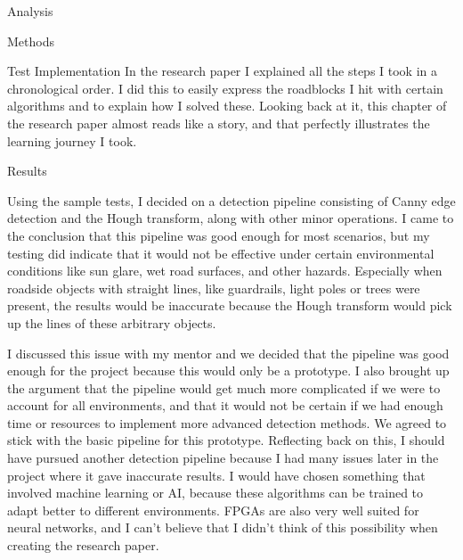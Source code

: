 \documentclass{matthijs}
\begin{document}
\begin{hoofdstuk}{Analysis}
\begin{paragraaf}{Methods}
\begin{subparagraaf}{Test Implementation}
				\noindent In the research paper I explained all the steps I took in a chronological order.
				I did this to easily express the roadblocks I hit with certain algorithms and to explain how I solved these.
				Looking back at it, this chapter of the research paper almost reads like a story, and that perfectly illustrates the learning journey I took.

			\end{subparagraaf}

		\end{paragraaf}

		\begin{paragraaf}{Results}
			
			Using the sample tests, I decided on a detection pipeline consisting of Canny edge detection and the Hough transform, along with other minor operations.
			I came to the conclusion that this pipeline was good enough for most scenarios, but my testing did indicate that it would not be effective under certain environmental conditions like sun glare, wet road surfaces, and other hazards.
			Especially when roadside objects with straight lines, like guardrails, light poles or trees were present, the results would be inaccurate because the Hough transform would pick up the lines of these arbitrary objects.
			
			I discussed this issue with my mentor and we decided that the pipeline was good enough for the project because this would only be a prototype.
			I also brought up the argument that the pipeline would get much more complicated if we were to account for all environments, and that it would not be certain if we had enough time or resources to implement more advanced detection methods.
			We agreed to stick with the basic pipeline for this prototype.
			Reflecting back on this, I should have pursued another detection pipeline because I had many issues later in the project where it gave inaccurate results.
			I would have chosen something that involved machine learning or AI, because these algorithms can be trained to adapt better to different environments.
			FPGAs are also very well suited for neural networks, and I can't believe that I didn't think of this possibility when creating the research paper.

		\end{paragraaf}
	\end{hoofdstuk}
	
\end{document}
